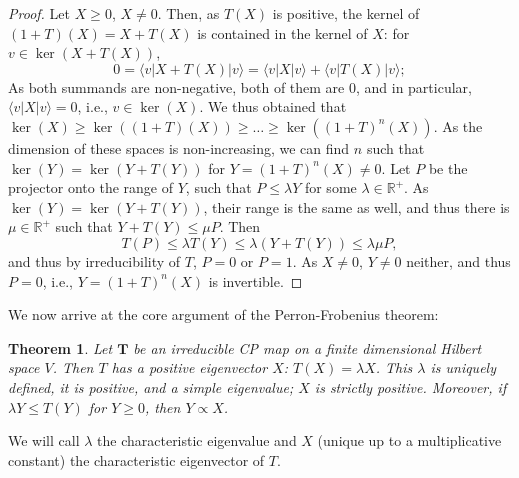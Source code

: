 \documentclass{article}
\newtheorem{theorem}{Theorem}
\newcommand{\ket}[1]{\vert #1 \rangle}
\newcommand{\bra}[1]{\langle #1 \vert}
\begin{document}
\begin{proof}
  Let $X\geq 0$, $X\neq 0$. Then, as $T(X)$ is positive, the kernel of $(1+T)(X) = X+T(X)$ is contained in the kernel of $X$: for $v\in \ker(X + T(X))$,
  \begin{equation*}
    0 = \bra{v} X + T(X) \ket{v} = \bra{v} X \ket{v} +  \bra{v} T(X) \ket{v};
  \end{equation*}
  As both summands are non-negative, both of them are $0$, and in particular, $\bra{v} X \ket{v} = 0$, i.e., $v\in\ker(X)$. We thus obtained that $\ker(X)\geq \ker((1+T)(X)) \geq \dots \geq \ker((1+T)^n (X))$. As the dimension of these spaces is non-increasing, we can find $n$ such that $\ker (Y) = \ker(Y + T(Y))$ for  $Y = (1+T)^n(X)\neq 0$. 
  Let $P$ be the projector onto the range of $Y$, such that $ P \leq \lambda Y$ for some $\lambda\in\mathbb{R}^+$. As $\ker (Y) = \ker(Y + T(Y))$, their range is the same as well, and thus there is $\mu\in\mathbb{R}^+$ such that $Y + T(Y) \leq \mu P$. Then
  \begin{equation*}
    T(P) \leq \lambda T(Y) \leq \lambda(Y+T(Y)) \leq \lambda\mu P,
  \end{equation*}
  and thus by irreducibility of $T$, $P=0$ or $P=1$. As $X\neq 0$, $Y\neq 0$ neither, and thus $P = 0$, i.e., $Y = (1+T)^n(X)$ is invertible.
\end{proof}

We now arrive at the core argument of the Perron-Frobenius theorem:
\begin{theorem}
  Let $\mathbf{T}$ be an irreducible CP map on a finite dimensional Hilbert space $V$. Then $T$ has a positive eigenvector $X$: $T(X) = \lambda X$. This $\lambda$ is uniquely defined, it is positive, and a simple eigenvalue; $X$ is strictly positive. Moreover, if $\lambda Y\leq T(Y)$ for $Y\geq 0$, then $Y \propto X$. 
\end{theorem}

We will call $\lambda$ the characteristic eigenvalue and $X$ (unique up to a multiplicative constant) the characteristic eigenvector of $T$.
\end{document}
